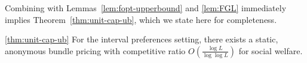 Combining  with
Lemmas~\ref{lem:fopt-upperbound} and \ref{lem:FGL} immediately implies
Theorem~\ref{thm:unit-cap-ub}, which we state here for completeness.

\begin{numberedtheorem}{\ref{thm:unit-cap-ub}}
For the interval preferences setting, there exists a static, anonymous bundle
pricing with competitive ratio $O\left(\frac{\log L}{\log\log
    L}\right)$ for social welfare.
\end{numberedtheorem}


